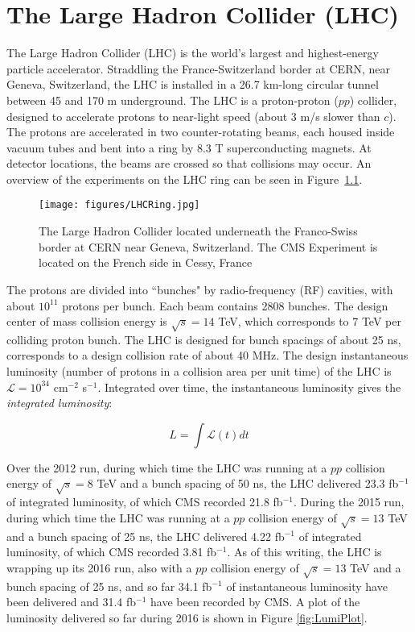 \chapter{The Large Hadron Collider (LHC)}

The Large Hadron Collider (LHC) is the world's largest and highest-energy particle accelerator. Straddling the France-Switzerland border at CERN, near Geneva, Switzerland, the LHC is installed in a 26.7 km-long circular tunnel between 45 and 170 m underground. The LHC is a proton-proton ($pp$) collider, designed to accelerate protons to near-light speed (about 3 m/s slower than $c$). The protons are accelerated in two counter-rotating beams, each housed inside vacuum tubes and bent into a ring by 8.3 T superconducting magnets. At detector locations, the beams are crossed so that collisions may occur. An overview of the experiments on the LHC ring can be seen in Figure~\ref{fig:LHCRing}. 

\begin{figure}\centering
  \texttt{[image: figures/LHCRing.jpg]}
  \caption{\label{fig:LHCRing} The Large Hadron Collider located underneath the Franco-Swiss border at CERN near Geneva, Switzerland. The CMS Experiment is located on the French side in Cessy, France}
\end{figure}

The protons are divided into ``bunches" by radio-frequency (RF) cavities, with about $10^{11}$ protons per bunch. Each beam contains 2808 bunches. The design center of mass collision energy is $\sqrt{s} = 14$ TeV, which corresponds to 7 TeV per colliding proton bunch. The LHC is designed for bunch spacings of about 25 ns, corresponds to a design collision rate of about 40 MHz. The design instantaneous luminosity (number of protons in a collision area per unit time) of the LHC is $\mathcal{L} = 10^{34}$ cm$^{-2}$ s$^{-1}$. Integrated over time, the instantaneous luminosity gives the \textit{integrated luminosity}:

\begin{equation}
L = \int\mathcal{L}(t)dt
\end{equation}

Over the 2012 run, during which time the LHC was running at a $pp$ collision energy of $\sqrt{s} = 8$ TeV and a bunch spacing of 50 ns, the LHC delivered 23.3 fb$^{-1}$ of integrated luminosity, of which CMS recorded 21.8 fb$^{-1}$. During the 2015 run, during which time the LHC was running at a $pp$ collision energy of $\sqrt{s} = 13$ TeV and a bunch spacing of 25 ns, the LHC delivered 4.22 fb$^{-1}$ of integrated luminosity, of which CMS recorded 3.81 fb$^{-1}$. As of this writing, the LHC is wrapping up its 2016 run, also with a $pp$ collision energy of $\sqrt{s} = 13$ TeV and a bunch spacing of 25 ns, and so far 34.1 fb$^{-1}$ of instantaneous luminosity have been delivered and 31.4 fb$^{-1}$ have been recorded by CMS. A plot of the luminosity delivered so far during 2016 is shown in Figure \ref{fig:LumiPlot}.

